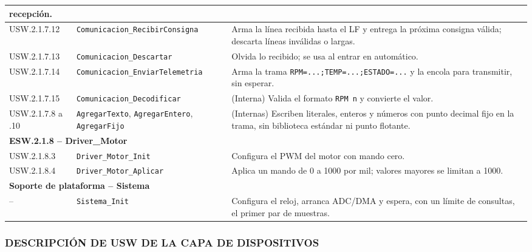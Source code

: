 \begin{longtable}{|p{2.4cm}|p{4.6cm}|p{7.6cm}|}
recepción. \\ \hline
USW.2.1.7.12 & \texttt{Comunicacion\_\-RecibirConsigna} & Arma la línea recibida hasta el
LF y entrega la próxima consigna válida; descarta líneas inválidas o largas. \\ \hline
USW.2.1.7.13 & \texttt{Comunicacion\_\-Descartar} & Olvida lo recibido; se usa al entrar en
automático. \\ \hline
USW.2.1.7.14 & \texttt{Comunicacion\_\-EnviarTelemetria} & Arma la trama
\texttt{RPM=...;TEMP=...;ESTADO=...} y la encola para transmitir, sin esperar. \\ \hline
USW.2.1.7.15 & \texttt{Comunicacion\_\-Decodificar} & (Interna) Valida el formato
\texttt{RPM n} y convierte el valor. \\ \hline
USW.2.1.7.8 a .10 & \texttt{AgregarTexto}, \texttt{AgregarEntero}, \texttt{AgregarFijo} &
(Internas) Escriben literales, enteros y números con punto decimal fijo en la trama, sin
biblioteca estándar ni punto flotante. \\ \hline
\multicolumn{3}{|l|}{\textbf{ESW.2.1.8 -- Driver\_Motor}} \\ \hline
USW.2.1.8.3 & \texttt{Driver\_Motor\_Init} & Configura el PWM del motor con mando
cero. \\ \hline
USW.2.1.8.4 & \texttt{Driver\_Motor\_Aplicar} & Aplica un mando de 0 a 1000 por mil;
valores mayores se limitan a 1000. \\ \hline
\multicolumn{3}{|l|}{\textbf{Soporte de plataforma -- Sistema}} \\ \hline
-- & \texttt{Sistema\_Init} & Configura el reloj, arranca ADC/DMA y espera, con un límite
de consultas, el primer par de muestras. \\ \hline
\end{longtable}

\subsubsection{DESCRIPCIÓN DE USW DE LA CAPA DE DISPOSITIVOS}


